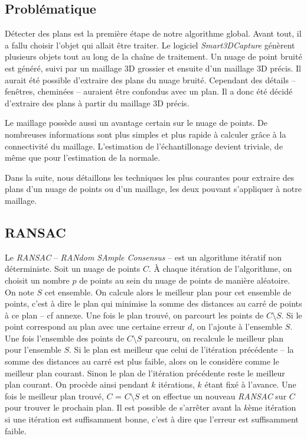 \documentclass[12pt, twoside]{article}
\begin{document}
\subsection{Problématique}
Détecter des plans est la première étape de notre algorithme global. Avant tout, il a fallu choisir l'objet qui allait être traiter. Le logiciel \textit{Smart3DCapture} génèrent plusieurs objets tout au long de la chaîne de traitement. Un nuage de point bruité est généré, suivi par un maillage 3D grossier et ensuite d'un maillage 3D précis. Il aurait été possible d'extraire des plans du nuage bruité. Cependant des détails -- fenêtres, cheminées -- auraient être confondus avec un plan. Il a donc été décidé d'extraire des plans à partir du maillage 3D précis.

Le maillage possède aussi un avantage certain sur le nuage de points. De nombreuses informations sont plus simples et plus rapide à calculer grâce à la connectivité du maillage. L'estimation de l'échantillonage devient triviale, de même que pour l'estimation de la normale.

Dans la suite, nous détaillons les techniques les plus courantes pour extraire des plans d'un nuage de points ou d'un maillage, les deux pouvant s'appliquer à notre maillage.

\subsection{RANSAC}
Le \textit{RANSAC} -- \textit{RANdom SAmple Consensus} -- est un algorithme itératif non déterministe. Soit un nuage de points $C$. À chaque itération de l’algorithme, on choisit un nombre $p$ de points au sein du nuage de points de manière aléatoire. On note $S$ cet ensemble. On calcule alors le meilleur plan pour cet ensemble de points, c’est à dire le plan qui minimise la somme des distances au carré de points à ce plan -- cf annexe. Une fois le plan trouvé, on parcourt les points de $C\setminus S$. Si le point correspond au plan avec une certaine erreur $d$, on l’ajoute à l’ensemble $S$. Une fois l’ensemble des points de $C\setminus S$ parcouru, on recalcule le meilleur plan pour l’ensemble $S$. Si le plan est meilleur que celui de l’itération précédente -- la somme des distances au carré est plus faible, alors on le considère comme le meilleur plan courant. Sinon le plan de l’itération précédente reste le meilleur plan courant. On procède ainsi pendant $k$ itérations, $k$ étant fixé à l’avance. Une fois le meilleur plan trouvé, $C$ = $C\setminus S$ et on effectue un nouveau \textit{RANSAC} sur $C$ pour trouver le prochain plan. Il est possible de s’arrêter avant la $k$ème itération si une itération est suffisamment bonne, c’est à dire que l’erreur est suffisamment faible.
\end{document}
